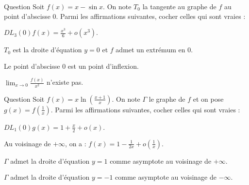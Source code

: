 \begin{multi}[multiple,feedback=
{Le \(DL_3(0)\sin x\) donne \(\displaystyle DL_3(0)f(x)=\frac{x^3}{6}+o(x^3)\). Donc \(T_0\) est la droite d'équation \(y=0\). Or, au voisinage de \(0\), on a :
\[f(x)-y=\frac{x^3}{6}+o(x^3).\]
Ce qui implique que le point d'abscisse \(0\) est un point d'inflexion. Enfin, 
\[\displaystyle \lim _{x\to 0}\frac{f(x)}{x^2}=\lim _{x\to 0}\left(\frac{x}{6}+o(x)\right)=0.\]
}]{Question}
Soit \(\displaystyle f(x)=x-\sin x\). On note \(T_0\) la tangente au graphe de \(f\) au point d'abscisse \(0\). Parmi les affirmations suivantes, cocher celles qui sont vraies :

    \item* \(\displaystyle DL_3(0)f(x)=\frac{x^3}{6}+o(x^3)\).
    \item \(T_0\) est la droite d'équation \(y=0\) et \(f\) admet un extrémum en \(0\).
    \item* Le point d'abscisse \(0\) est un point d'inflexion.
    \item \(\displaystyle \lim _{x\to 0}\frac{f(x)}{x^2}\) n'existe pas.
\end{multi}


\begin{multi}[multiple,feedback=
{D'abord, \(\displaystyle g(x)=\frac{\ln (1+x)}{x}=1-\frac{x}{2}+o(x)\). Donc, au voisinage de \(\pm\infty\), on a :
\[f(x)=1-\frac{1}{2x}+o\left(\frac{1}{x}\right)\mbox{ car }f(x)=g\left(\frac{1}{x}\right).\]
La droite d'équation \(y=1\) est une asymptote au voisinage de \(\pm\infty\).
}]{Question}
Soit \(\displaystyle f(x)=x\ln \left(\frac{x+1}{x}\right)\). On note \(\Gamma\) le graphe de \(f\) et on pose \(\displaystyle g(x)=f\left(\frac{1}{x}\right)\). Parmi les affirmations suivantes, cocher celles qui sont vraies :

    \item \(\displaystyle DL_1(0)g(x)=1+\frac{x}{2}+o(x)\).
    \item* Au voisinage de \(+\infty\), on a : \(\displaystyle f(x)=1-\frac{1}{2x}+o\left(\frac{1}{x}\right)\).
    \item* \(\Gamma\) admet la droite d'équation \(y=1\) comme asymptote au voisinage de \(+\infty\).
    \item \(\Gamma\) admet la droite d'équation \(y=-1\) comme asymptote au voisinage de \(-\infty\).
\end{multi}


